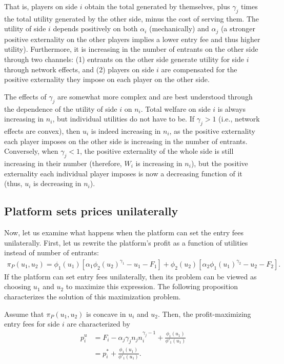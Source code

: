 That is, players on side $i$ obtain the total generated by themselves, plus $\gamma_j$ times the total utility generated by the other side, minus the cost of serving them.
The utility of side $i$ depends positively on both $\alpha_i$ (mechanically) and $\alpha_j$ (a stronger positive externality on the other players implies a lower entry fee and thus higher utility).
Furthermore, it is increasing in the number of entrants on the other side through two channels: (1) entrants on the other side generate utility for side $i$ through network effects, and (2) players on side $i$ are compensated for the positive externality they impose on each player on the other side.

The effects of $\gamma_j$ are somewhat more complex and are best understood through the dependence of the utility of side $i$ on $n_i$.
Total welfare on side $i$ is always increasing in $n_i$, but individual utilities do not have to be.
If $\gamma_j > 1$ (i.e., network effects are convex), then $u_i$ is indeed increasing in $n_i$, as the positive externality each player imposes on the other side is increasing in the number of entrants.
Conversely, when $\gamma_j < 1$, the positive externality of the whole side is still increasing in their number (therefore, $W_i$ is increasing in $n_i$), but the positive externality each individual player imposes is now a decreasing function of it (thus, $u_i$ is decreasing in $n_i$).

\subsection{Platform sets prices unilaterally}

Now, let us examine what happens when the platform can set the entry fees unilaterally.
First, let us rewrite the platform's profit as a function of utilities instead of number of entrants:
\begin{align*}
    \pi_P(u_1, u_2) = \phi_1(u_1) [\alpha_1 \phi_2(u_2) ^ {\gamma_1} - u_1 - F_1] + \phi_2(u_2) [\alpha_2 \phi_1(u_1) ^ {\gamma_2} - u_2 - F_2].
\end{align*}
If the platform can set entry fees unilaterally, then its problem can be viewed as choosing $u_1$ and $u_2$ to maximize this expression.
The following proposition characterizes the solution of this maximization problem.
\begin{proposition}
    \label{prop:unilateral_entry_fees}
    Assume that $\pi_P(u_1, u_2)$ is concave in $u_i$ and $u_2$.
    Then, the profit-maximizing entry fees for side $i$ are characterized by
    \begin{align}
        p_i^u &= F_i - \alpha_j \gamma_j n_j n_i^{\gamma_j - 1} + \frac{\phi_1(u_1)}{\phi'_1(u_1)}  \label{eq:unilateral_entry_fees} \\
              &= p_i^* + \frac{\phi_1(u_1)}{\phi'_1(u_1)}.  \nonumber
    \end{align}
\end{proposition}

